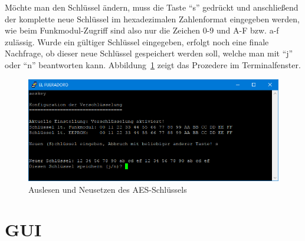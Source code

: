 \documentclass[paper=a4, parskip, numbers=noenddot, toc=listof, headsepline]{scrbook}
\begin{document}
					Möchte man den Schlüssel ändern, muss die Taste \enquote{s} gedrückt und anschließend der komplette neue Schlüssel im hexadezimalen Zahlenformat eingegeben werden, wie beim Funkmodul-Zugriff sind also nur die Zeichen 0-9 und A-F bzw. a-f zulässig. Wurde ein gültiger Schlüssel eingegeben, erfolgt noch eine finale Nachfrage, ob dieser neue Schlüssel gespeichert werden soll, welche man mit \enquote{j} oder \enquote{n} beantworten kann. Abbildung~\ref{fig:aeskey} zeigt das Prozedere im Terminalfenster.
					
					\begin{figure}[!h]
						\centering
						\includegraphics[width=.8\textwidth]{Bilder/aeskey}
						\caption{Auslesen und Neusetzen des AES-Schlüssels}
						\label{fig:aeskey}
					\end{figure}
					\clearpage

			\section{GUI}
\end{document}
